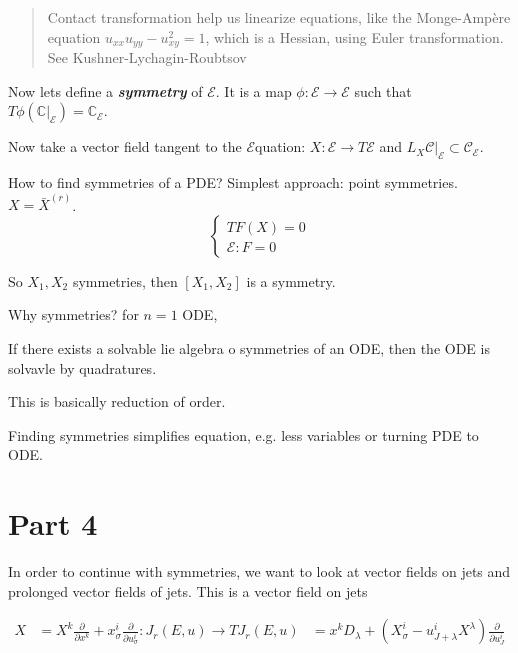 \begin{quotation}
	Contact transformation help us linearize equations, like the Monge-Ampère equation $u_{xx}u_{y y}-u^2_{xy}=1$, which is a Hessian, using Euler transformation. See Kushner-Lychagin-Roubtsov
\end{quotation}

Now lets define a \textit{\textbf{symmetry}} of  $ \mathcal{E}$. It is a map $\phi:\mathcal{E}\to \mathcal{E}$ such that $T\phi(\mathbb{C}|_{\mathcal{E}})=\mathbb{C}_{\mathcal{E}}$.

Now take a vector field tangent to the $\mathcal{E}$quation: $X: \mathcal{E} \to T\mathcal{E}$ and $L_X\mathcal{C}|_{\mathcal{E}}\subset \mathcal{C}_{\mathcal{E}}$.

How to find symmetries of a PDE? Simplest approach: point symmetries. $X=\bar{X}^{(r)}$.
\[\begin{cases}
	TF(X)=0\\
	\mathcal{E}:F=0
\end{cases}\]

So $X_1,X_2$ symmetries, then $[X_1,X_2]$ is a symmetry.

Why symmetries? for $n=1$ ODE,

 \begin{thm}\leavevmode
If there exists a solvable lie algebra o symmetries of an ODE, then the ODE is solvavle by quadratures.
\end{thm}
This is basically reduction of order.

\begin{upshot}\leavevmode
	Finding symmetries simplifies equation, e.g. less variables or turning PDE to ODE.
\end{upshot}

\section{Part 4}

In order to continue with symmetries, we want to look at vector fields on jets and prolonged vector fields of jets. This is a vector field on jets

\begin{align*}X&=X^k \frac{\partial }{\partial x^k}+x^i_\sigma \frac{\partial }{\partial u^i_\sigma}:J_r(E,u)\to T J_r(E,u)
&=x^kD_\lambda+(X^i_\sigma-u^i_{J +\lambda}X^\lambda)\frac{\partial }{\partial u^i_J}
\end{align*}

